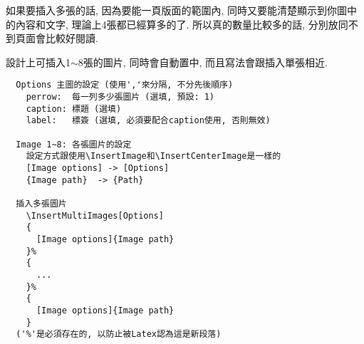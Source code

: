 
\newpage
{}

  如果要插入多張的話, 因為要能一頁版面的範圍內, 同時又要能清楚顯示到你圖中的內容和文字, 理論上4張都已經算多的了. 所以真的數量比較多的話, 分別放同不到頁面會比較好閱讀.

  設計上可插入1$\sim$8張的圖片, 同時會自動置中, 而且寫法會跟插入單張相近.

  \begin{framed}
  \begin{verbatim}
  Options 主圖的設定 (使用','來分隔, 不分先後順序)
    perrow:  每一列多少張圖片 (選填, 預設: 1)
    caption: 標題 (選填)
    label:   標簽 (選填, 必須要配合caption使用, 否則無效)

  Image 1~8: 各張圖片的設定
    設定方式跟使用\InsertImage和\InsertCenterImage是一樣的
    [Image options] -> [Options]
    {Image path}  -> {Path}

  插入多張圖片
    \InsertMultiImages[Options]
    {
      [Image options]{Image path}
    }%
    {
      ...
    }%
    {
      [Image options]{Image path}
    }
  ('%'是必須存在的, 以防止被Latex認為這是新段落)
  \end{verbatim}
  \end{framed}

